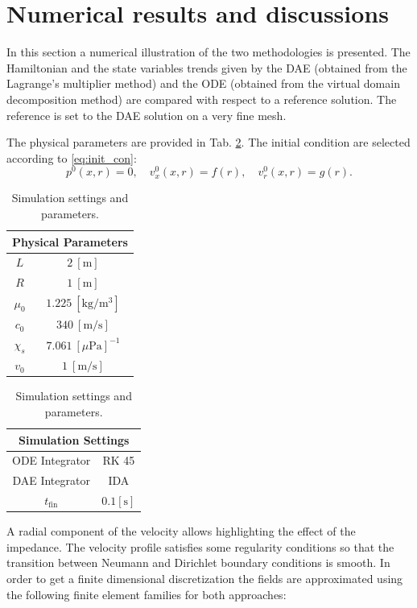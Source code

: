 \documentclass{ifacconf}
\begin{document}
\section{Numerical results and discussions}
\label{sec:numerics}
In this section a numerical illustration of the two methodologies is presented. The Hamiltonian and the state variables trends given by the DAE (obtained from the Lagrange's multiplier method) and the ODE (obtained from the virtual domain decomposition method) are compared with respect to a reference solution. The reference is set to the DAE solution on a very fine mesh.

The physical parameters are provided in Tab. \ref{tab:par}. 
The initial condition are selected according to \eqref{eq:init_con}:
\begin{equation*}
p^0(x, r) = 0 , \quad v_x^0(x, r) = f(r), \quad v_r^0(x, r) = g(r). 
\end{equation*}

\begin{table}[t]
	\centering
	\begin{tabular}{|c|c|}
		\hline 
		\multicolumn{2}{|c|}{Physical Parameters} \\ 
		\hline 
		$L$ & $2\ [\textrm{m}]$ \\ 
		$R$ & $1\ [\textrm{m}]$ \\
		$\mu_0$ & $1.225\ [\textrm{kg}/\textrm{m}^3]$ \\ 
		$c_0$ & $340\ [\textrm{m/s}]$ \\
        $\chi_s$ & $7.061 \ [\mu\textrm{Pa}]^{-1}$ \\ 
		$v_0$ & $1\ [\textrm{m/s}]$ \\ 
		\hline 
	\end{tabular} 
	\begin{tabular}{|c|c|}
		\hline 
		\multicolumn{2}{|c|}{Simulation Settings} \\ 
		\hline 
		ODE Integrator & RK 45\\
		DAE Integrator & IDA\\ 
		$t_{\text{fin}}$& $0.1  [\textrm{s}]$ \\ 
		\hline 
	\end{tabular} 
	\vspace{1mm}
	\caption{Simulation settings and parameters.}
	\label{tab:par}
\end{table}

A radial component of the velocity allows highlighting the effect of the impedance. The velocity profile satisfies some regularity conditions so that the transition between Neumann and Dirichlet boundary conditions is smooth. In order to get a finite dimensional discretization the fields are approximated using the following finite element families for both approaches:
\end{document}
